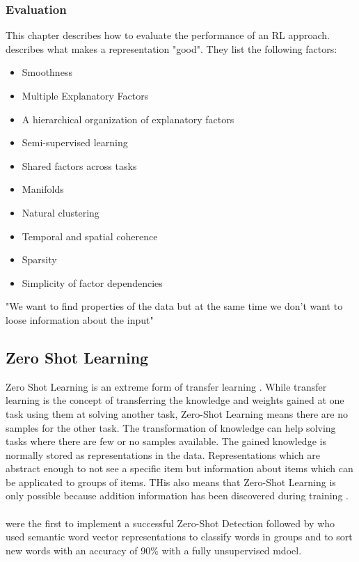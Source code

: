 \subsubsection{Evaluation}\label{theory:evaluation}
This chapter describes how to evaluate the performance of an RL approach.\\
\cite{bengio_representation_2013} describes what makes a representation "good". They list the following factors:
\begin{itemize}
  \item Smoothness
  \item Multiple Explanatory Factors
  \item A hierarchical organization of explanatory factors
  \item Semi-supervised learning
  \item Shared factors across tasks
  \item Manifolds
  \item Natural clustering
  \item Temporal and spatial coherence
  \item Sparsity
  \item Simplicity of factor dependencies
\end{itemize}
"We want to find properties of the data but at the same time we don't want to loose information about the input" \cite[S. 525]{goodfellow_deep_2016}\\

\subsection{Zero Shot Learning}
Zero Shot Learning is an extreme form of transfer learning \cite[S. 536]{goodfellow_deep_2016}. While transfer learning is the concept of transferring the knowledge and weights gained at one task using them at solving another task, Zero-Shot Learning means there are no samples for the other task. The transformation of knowledge can help solving tasks where there are few or no samples available. The gained knowledge is normally stored as representations in the data. Representations which are abstract enough to not see a specific item but information about items which can be applicated to groups of items. THis also means that Zero-Shot Learning is only possible because addition information has been discovered during training \cite[S. 536]{goodfellow_deep_2016}. \\\\
 were the first to implement a successful Zero-Shot Detection followed by  who used semantic word vector representations to classify words in groups and to sort new words with an accuracy of 90\% with a fully unsupervised mdoel.\\
